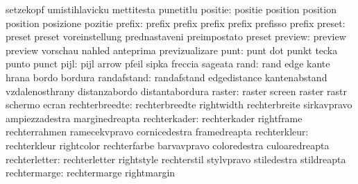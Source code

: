                            setzekopf                 umistihlavicku
                           mettitesta                punetitlu %
                  positie: positie                   position
                           position                  position
                           posizione                 pozitie %
                   prefix: prefix                    prefix
                           prefix                    prefix
                           prefisso                  prefix
                   preset: preset                    preset
                           voreinstellung            prednastaveni
                           preimpostato              preset %
                  preview: preview                   preview
                           vorschau                  nahled
                           anteprima                 previzualizare
                     punt: punt                      dot
                           punkt                     tecka
                           punto                     punct
                     pijl: pijl                      arrow
                           pfeil                     sipka
                           freccia                   sageata
                     rand: rand                      edge
                           kante                     hrana
                           bordo                     bordura
              randafstand: randafstand               edgedistance
                           kantenabstand             vzdalenosthrany
                           distanzabordo             distantabordura
                   raster: raster                    screen
                           raster                    rastr
                           schermo                   ecran
           rechterbreedte: rechterbreedte            rightwidth
                           rechterbreite             sirkavpravo
                           ampiezzadestra            marginedreapta
             rechterkader: rechterkader              rightframe
                           rechterrahmen             ramecekvpravo
                           cornicedestra             framedreapta
             rechterkleur: rechterkleur              rightcolor
                           rechterfarbe              barvavpravo
                           coloredestra              culoaredreapta
            rechterletter: rechterletter             rightstyle
                           rechterstil               stylvpravo
                           stiledestra               stildreapta
             rechtermarge: rechtermarge              rightmargin

